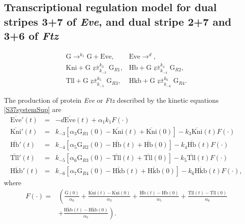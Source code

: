 \documentclass[final,authoryear, 5p, times]{elsarticle}
\begin{document}
\subsection{Transcriptional regulation model for dual stripes 3+7 of \textit{Eve}, and dual stripe 2+7 and 3+6 of \textit{Ftz}}

\begin{equation} \label{S37systemSup}
    \begin{array}{ll}
        \displaystyle
        \text{G} \mathop{\longrightarrow}^{k_{1}} \text{G} + \text{Eve}, &\displaystyle
        \text{Eve} \mathop{\longrightarrow}^{d} , \\\displaystyle 
        \text{Kni} + \text{G} \mathop{\rightleftarrows}^{k_{3}}_{k_{-3}} \text{G}_{R1}, &\displaystyle
       \text{Hb} + \text{G} \mathop{\rightleftarrows}^{k_{4}}_{k_{-4}} \text{G}_{R2},\\\displaystyle 
        \text{Tll} + \text{G} \mathop{\rightleftarrows}^{k_{5}}_{k_{-5}} \text{G}_{R3}, &\displaystyle
        \text{Hkb} + \text{G} \mathop{\rightleftarrows}^{k_{6}}_{k_{-6}} \text{G}_{R4}.
    \end{array}
\end{equation}

The production of protein \textit{Eve} or \textit{Ftz} described by the kinetic equations \eqref{S37systemSup} are
$$
\begin{array}{lcl}
    \overline{\text{Eve}}'(t) &=& -d \overline{\text{Eve}}(t) + \alpha_1 k_1 F(\cdot) \\[5pt]
        \overline{\text{Kni}}'(t)&= & k_{-3} \left[\alpha_3 \text{G}_{R1}(0)-\overline{\text{Kni}}(t)+\overline{\text{Kni}}(0)\right]-k_3 \overline{\text{Kni}}(t) F(\cdot) \\[5pt]
    \overline{\text{Hb}}'(t)&= & k_{-4} \left[\alpha_5 \text{G}_{R2}(0)-\overline{\text{Hb}}(t)+\overline{\text{Hb}}(0)\right]- k_4 \overline{\text{Hb}}(t) F(\cdot) \\[5pt]
    \overline{\text{Tll}}'(t) & =&k_{-5} \left[\alpha_6 \text{G}_{R3}(0)-\overline{\text{Tll}}(t)+\overline{\text{Tll}}(0)\right]-k_5 \overline{\text{Tll}}(t) F(\cdot) \\[5pt] 
    \overline{\text{Hkb}}'(t)&= & k_{-6} \left[\alpha_7 \text{G}_{R4}(0)-\overline{\text{Hkb}}(t)+\overline{\text{Hkb}}(0)\right]-k_6 \overline{\text{Hkb}}(t) F(\cdot) ,
\end{array}
$$
where
\scriptsize{$$
\begin{array}{ll}
F(\cdot)= &  \left(\frac{\overline{\text{G}}(0)}{\alpha_0}+ \frac{\overline{\text{Kni}}(t) - \overline{\text{Kni}}(0)}{\alpha_3}+\frac{\overline{\text{Hb}}(t)-\overline{\text{Hb}}(0)}{\alpha_5} + \frac{\overline{\text{Tll}}(t)-\overline{\text{Tll}}(0)}{\alpha_6}\right. \\ & \left. + \frac{\overline{\text{Hkb}}(t)-\overline{\text{Hkb}}(0)}{\alpha_7}    \right).
\end{array}
$$}
\end{document}
